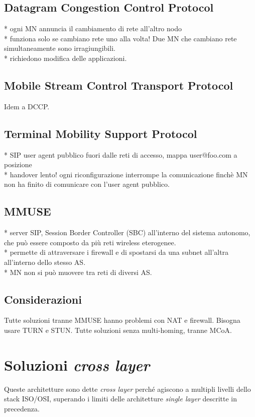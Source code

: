 \documentclass[12pt,a4paper,openright,twoside]{book}
\begin{document}
\subsection{Datagram Congestion Control Protocol}
* ogni MN annuncia il cambiamento di rete all'altro nodo\\
* funziona solo se cambiano rete uno alla volta! Due MN che cambiano
  rete simultaneamente sono irragiungibili.\\
* richiedono modifica delle applicazioni.\\

\subsection{Mobile Stream Control Transport Protocol}
Idem a DCCP.

\subsection{Terminal Mobility Support Protocol}
* SIP user agent pubblico fuori dalle reti di accesso, mappa
  user@foo.com a posizione\\
* handover lento! ogni riconfigurazione interrompe la comunicazione
  finchè MN non ha finito di comunicare con l'user agent pubblico.

\subsection{MMUSE}
* server SIP, Session Border Controller (SBC) all'interno del
  sistema autonomo, che può essere composto da più reti wireless
  eterogenee.\\
* permette di attraversare i firewall e di spostarsi da una subnet
  all'altra all'interno dello stesso AS.\\
* MN non si può muovere tra reti di diversi AS.\\

\subsection{Considerazioni}
Tutte soluzioni tranne MMUSE hanno problemi con NAT e
firewall. Bisogna usare TURN e STUN. Tutte soluzioni senza
multi-homing, tranne MCoA.

\section{Soluzioni \emph{cross layer}}
Queste architetture sono dette \emph{cross layer} perché agiscono a
multipli livelli dello stack ISO/OSI, superando i limiti delle
architetture \emph{single layer} descritte in precedenza.
\end{document}

